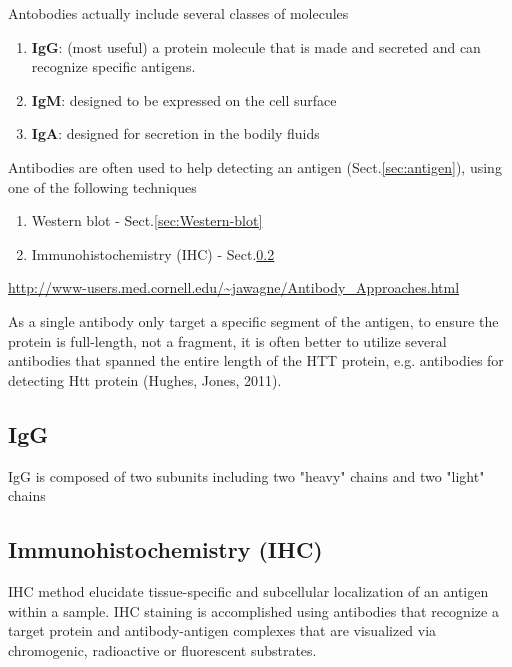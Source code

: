 Antobodies actually include several classes of molecules
\begin{enumerate}
  \item {\bf IgG}: (most useful)  a protein molecule that is made and secreted
  and can recognize specific antigens.
  
  \item {\bf IgM}: designed to be expressed on the cell surface
  
  \item {\bf IgA}: designed for secretion in the bodily fluids 
\end{enumerate}

Antibodies are often used to help detecting an antigen (Sect.\ref{sec:antigen}),
using one of the following techniques
\begin{enumerate}
  \item Western blot - Sect.\ref{sec:Western-blot}
  
  \item Immunohistochemistry (IHC) - Sect.\ref{sec:immunohistochemistry}
\end{enumerate}
\url{http://www-users.med.cornell.edu/~jawagne/Antibody_Approaches.html}

As a single antibody only target a specific segment of the antigen, to ensure
the protein is full-length, not a fragment, it is often better to 
utilize several antibodies that spanned the entire length of the HTT protein,
e.g. antibodies for detecting Htt protein (Hughes, Jones, 2011).





\subsection{IgG}
\label{sec:IgG-antibody}

IgG is composed of two subunits including two "heavy" chains and two "light"
chains

\subsection{Immunohistochemistry (IHC)}
\label{sec:immunohistochemistry}

IHC method elucidate tissue-specific and subcellular localization of an antigen
within a sample.  IHC staining is accomplished using antibodies that recognize a
target protein and antibody-antigen complexes that are visualized via
chromogenic, radioactive or fluorescent substrates.

